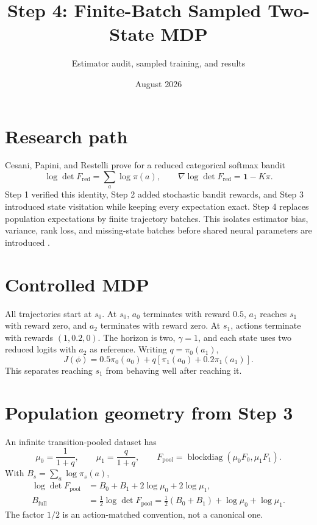 \documentclass[10pt,a4paper]{article}
\title{Step 4: Finite-Batch Sampled Two-State MDP}
\author{Estimator audit, sampled training, and results}
\date{August 2026}
\begin{document}
\maketitle
\begin{center}
\end{center}
\tableofcontents

\section{Research path}
Cesani, Papini, and Restelli prove for a reduced categorical softmax bandit
\begin{equation}
\log\det F_{\mathrm{red}}=\sum_a\log\pi(a),
\qquad \nabla\log\det F_{\mathrm{red}}=\mathbf 1-K\pi.
\end{equation}
Step 1 verified this identity, Step 2 added stochastic bandit rewards, and
Step 3 introduced state visitation while keeping every expectation exact.
Step 4 replaces population expectations by finite trajectory batches. This
isolates estimator bias, variance, rank loss, and missing-state batches before
shared neural parameters are introduced \cite{cesani2026}.

\section{Controlled MDP}
All trajectories start at $s_0$. At $s_0$, $a_0$ terminates with reward $0.5$,
$a_1$ reaches $s_1$ with reward zero, and $a_2$ terminates with reward zero.
At $s_1$, actions terminate with rewards $(1,0.2,0)$. The horizon is two,
$\gamma=1$, and each state uses two reduced logits with $a_2$ as reference.
Writing $q=\pi_0(a_1)$,
\begin{equation}
J(\phi)=0.5\pi_0(a_0)+q[\pi_1(a_0)+0.2\pi_1(a_1)].
\end{equation}
This separates reaching $s_1$ from behaving well after reaching it.

\section{Population geometry from Step 3}
An infinite transition-pooled dataset has
\begin{equation}
\mu_0=\frac{1}{1+q},\qquad \mu_1=\frac{q}{1+q},\qquad
F_{\mathrm{pool}}=\operatorname{blockdiag}(\mu_0F_0,\mu_1F_1).
\end{equation}
With $B_s=\sum_a\log\pi_s(a)$,
\begin{align}
\log\det F_{\mathrm{pool}}&=B_0+B_1+2\log\mu_0+2\log\mu_1,\\
B_{\mathrm{full}}&=\tfrac12\log\det F_{\mathrm{pool}}
=\tfrac12(B_0+B_1)+\log\mu_0+\log\mu_1.
\end{align}
The factor $1/2$ is an action-matched convention, not a canonical one.
\end{document}
